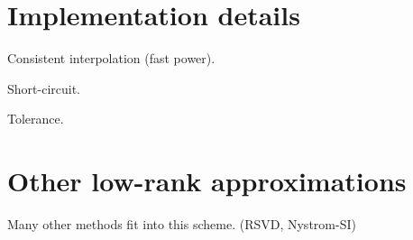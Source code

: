 %


\section{Implementation details}
\label{sec:3-nystrom-implementation-details}

Consistent interpolation (fast power).

Short-circuit.

Tolerance.


\section{Other low-rank approximations}
\label{sec:3-nystrom-other-low-rank}

Many other methods fit into this scheme. (RSVD, Nystrom-SI)

